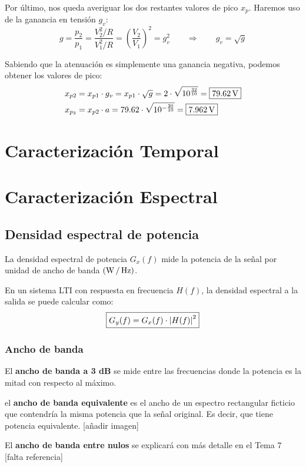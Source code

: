 \documentclass[a4paper]{book}
\begin{document}
Por último, nos queda averiguar los dos restantes valores de pico $x_p$. Haremos uso de la ganancia en tensión $g_v$:
\[ g = \frac{p_2}{p_1} = \frac{V^2_2 / R}{V^2_1 / R} = \left( \frac{V_2}{V_1} \right)^2 = g_v^2 \qquad \Longrightarrow \qquad g_v = \sqrt{g} \]

Sabiendo que la atenuación es simplemente una ganancia negativa, podemos obtener los valores de pico:
\begin{align*}
	x_{p2}  & = x_{p1} \cdot g_v = x_{p1} \cdot \sqrt{g} = 2 \cdot \sqrt{10^{\frac{32}{10}}} = \boxed{79.62\operatorname{V}} \\
	x_{p_3} & = x_{p2} \cdot a = 79.62 \cdot \sqrt{10^{-\frac{20}{10}}} = \boxed{7.962\operatorname{V}}
\end{align*}

\section{Caracterización Temporal}
\section{Caracterización Espectral}

\subsection{Densidad espectral de potencia}

La densidad espectral de potencia $G_x(f)$ mide la potencia de la señal por unidad de ancho de banda $\left( \operatorname{W} / \operatorname{Hz} \right)$.

En un sistema LTI con respuesta en frecuencia $H(f)$, la densidad espectral a la salida se puede calcular como:
\[ \boxed{G_y(f) = G_x(f) \cdot \abs{H(f)}^2} \]

\subsubsection{Ancho de banda}

El \textbf{ancho de banda a 3 dB} se mide entre las frecuencias donde la potencia es la mitad con respecto al máximo.

el \textbf{ancho de banda equivalente} es el ancho de un espectro rectangular ficticio que contendría la misma potencia que la señal original. Es decir, que tiene potencia equivalente. [añadir imagen]

El \textbf{ancho de banda entre nulos} se explicará con más detalle en el Tema 7 [falta referencia]
\end{document}
